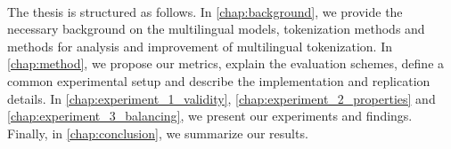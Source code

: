 
~   

The thesis is structured as follows. In \autoref{chap:background}, we provide the necessary background on the multilingual models, tokenization methods and methods for analysis and improvement of multilingual tokenization. In \autoref{chap:method}, we propose our metrics, explain the evaluation schemes, define a common experimental setup and describe the implementation and replication details. In \autoref{chap:experiment_1_validity}, \autoref{chap:experiment_2_properties} and \autoref{chap:experiment_3_balancing}, we present our experiments and findings. Finally, in \autoref{chap:conclusion}, we summarize our results.





